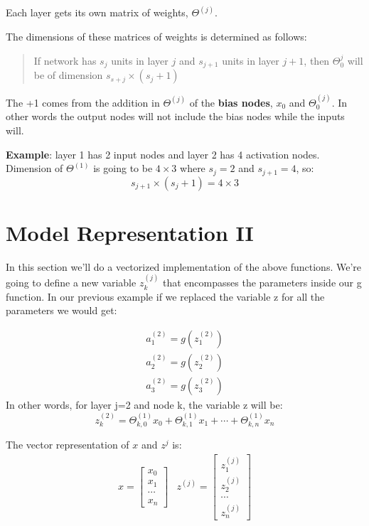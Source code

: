 Each layer gets its own matrix of weights, $\Theta^{(j)}$.

The dimensions of these matrices of weights is determined as follows:
\begin{quote}
If network has $s_j$ units in layer $j$  and $s_{j+1}$ units in layer $j+1$, then $\Theta_0^{j}$ will be of dimension $s_{s+j}\times(s_j+1)$
\end{quote}

The +1 comes from the addition in $\Theta^{(j)}$ of the \textbf{bias nodes}, $x_0$ and $\Theta_0^{(j)}$. In other words the output nodes will not include the bias nodes while the inputs will.

\textbf{Example}: layer 1 has 2 input nodes and layer 2 has 4 activation nodes. Dimension of $\Theta^{(1)}$ is going to be $4\times 3$ where $s_j = 2$ and $s_{j+1} = 4$, so: $$s_{j+1} \times (s_j + 1) = 4 \times 3$$

\section{Model Representation II}
In this section we'll do a vectorized implementation of the above functions. We're going to define a new variable $z_k^{(j)}$ that encompasses the parameters inside our g function. In our previous example if we replaced the variable z for all the parameters we would get:

\begin{align*}
a_1^{(2)} = g(z_1^{(2)}) \\
a_2^{(2)} = g(z_2^{(2)}) \\ 
a_3^{(2)} = g(z_3^{(2)})
\end{align*}
In other words, for layer j=2 and node k, the variable z will be:
\[
z_k^{(2)} = \Theta_{k,0}^{(1)}x_0 + \Theta_{k,1}^{(1)}x_1 + \cdots + \Theta_{k,n}^{(1)}x_n
\]

The vector representation of $x$ and $z^{j}$ is:
\begin{align*}
x = 
\begin{bmatrix}
x_0 \\ 
x_1 \\
\cdots \\ 
x_n
\end{bmatrix} 
&z^{(j)} = 
\begin{bmatrix}
z_1^{(j)} \\
z_2^{(j)} \\
\cdots \\ 
z_n^{(j)}
\end{bmatrix}
\end{align*}

